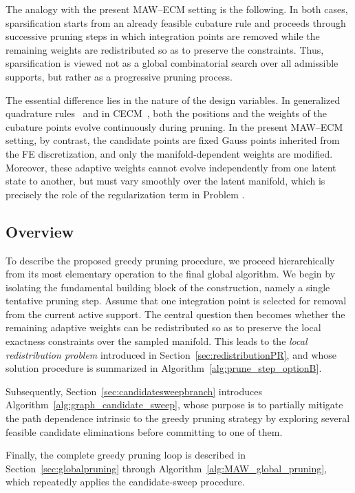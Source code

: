\documentclass[11pt,a4paper]{article}
\begin{document}
The analogy with the present MAW--ECM setting is the following. In both
cases, sparsification starts from an already feasible cubature rule and
proceeds through successive pruning steps in which integration points are
removed while the remaining weights are redistributed so as to preserve the
constraints. Thus, sparsification is viewed not as a global combinatorial
search over all admissible supports, but rather as a progressive pruning
process.

The essential difference lies in the nature of the design variables. In
generalized quadrature rules~\cite{bremer2010nonlinear,xiao2010numerical} and
in CECM~\cite{hernandez2024cecm}, both the positions and the weights of the
cubature points evolve continuously during pruning. In the present MAW--ECM
setting, by contrast, the candidate points are fixed Gauss points inherited
from the FE discretization, and only the manifold-dependent weights are
modified. Moreover, these adaptive weights cannot evolve independently from
one latent state to another, but must vary smoothly over the latent manifold,
which is precisely the role of the regularization term in Problem .


\subsection{Overview}

To describe the proposed   greedy pruning procedure, we proceed
hierarchically from its most elementary operation to the final global
algorithm. We begin by isolating the fundamental building block of the
construction, namely a single tentative pruning step. Assume that one
integration point is selected for removal from the current active
support. The central question then becomes whether the remaining
adaptive weights can be redistributed so as to preserve the local
exactness constraints over the sampled manifold. This leads to the
\emph{local redistribution problem} introduced in
Section~\ref{sec:redistributionPR}, and  whose solution procedure is
summarized in Algorithm~\ref{alg:prune_step_optionB}.


Subsequently,
Section~\ref{sec:candidatesweepbranch} introduces
Algorithm~\ref{alg:graph_candidate_sweep}, whose purpose is to partially
mitigate the path dependence intrinsic to the greedy pruning strategy by
exploring several feasible candidate eliminations before committing to
one of them.

Finally, the complete greedy pruning loop is described in
Section~\ref{sec:globalpruning} through
Algorithm~\ref{alg:MAW_global_pruning}, which repeatedly applies the
candidate-sweep procedure.
\end{document}
